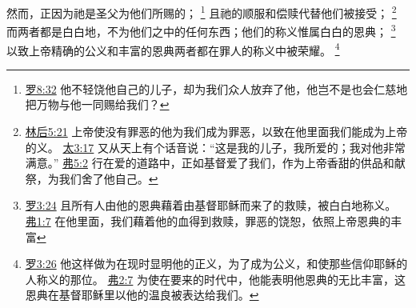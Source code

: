 \documentclass[12pt, a4paper, oneside]{ctexart}
\begin{document}
	然而，正因为祂是圣父为他们所赐的；
	\footnote {
		\href{https://biblehub.com/romans/8-32.htm}{罗8:32} 他不轻饶他自己的儿子，却为我们众人放弃了他，他岂不是也会仁慈地把万物与他一同赐给我们？
	}
	且祂的顺服和偿赎代替他们被接受；
	\footnote {
		\href{https://biblehub.com/2_corinthians/5-21.htm}{林后5:21} 上帝使没有罪恶的他为我们成为罪恶，以致在他里面我们能成为上帝的义。
		\href{https://biblehub.com/matthew/3-17.htm}{太3:17} 又从天上有个话音说：“这是我的儿子，我所爱的；我对他非常满意。”
		\href{https://biblehub.com/ephesians/5-2.htm}{弗5:2} 行在爱的道路中，正如基督爱了我们，作为上帝香甜的供品和献祭，为我们舍了他自己。
	}
	而两者都是白白地，不为他们之中的任何东西；他们的称义惟属白白的恩典；
	\footnote {
		\href{https://biblehub.com/romans/3-24.htm}{罗3:24} 且所有人由他的恩典藉着由基督耶稣而来了的救赎，被白白地称义。
		\href{https://biblehub.com/ephesians/1-7.htm}{弗1:7} 在他里面，我们藉着他的血得到救赎，罪恶的饶恕，依照上帝恩典的丰富
	}
	以致上帝精确的公义和丰富的恩典两者都在罪人的称义中被荣耀。
	\footnote {
		\href{https://biblehub.com/romans/3-26.htm}{罗3:26} 他这样做为在现时显明他的正义，为了成为公义，和使那些信仰耶稣的人称义的那位。
		\href{https://biblehub.com/ephesians/2-7.htm}{弗2:7} 为使在要来的时代中，他能表明他恩典的无比丰富，这恩典在基督耶稣里以他的温良被表达给我们。
	}
\end{document}
